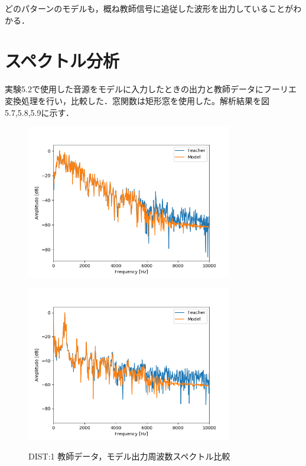 \documentclass{jreport}		%
\begin{document}
\clearpage

どのパターンのモデルも，概ね教師信号に追従した波形を出力していることがわかる．

\section{スペクトル分析}
実験5.2で使用した音源をモデルに入力したときの出力と教師データにフーリエ変換処理を行い，比較した．窓関数は矩形窓を使用した。解析結果を図5.7,5.8,5.9に示す．

\begin{figure}[htbp]
 \begin{minipage}{0.5\hsize}
 \begin{center}
  \includegraphics[width=90mm]{gain1_fft_hikaku.png}
 \end{center}
 \label{fig:one}
 \end{minipage}
 \begin{minipage}{0.5\hsize}
 \begin{center}
  \includegraphics[width=90mm]{gain1_fft_hikaku2.png}
 \end{center}
 \label{fig:two}
 \end{minipage}
 \caption{DIST:1 教師データ，モデル出力周波数スペクトル比較}
\end{figure}
\end{document}

